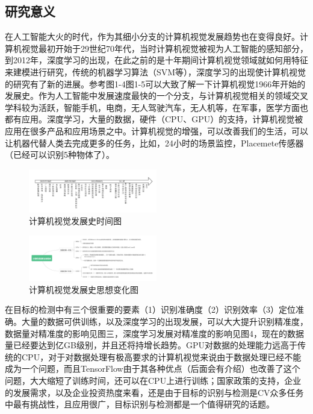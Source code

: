 		\subsection{研究意义}
		在人工智能大火的时代，作为其细小分支的计算机视觉发展趋势也在变得良好。计算机视觉最初开始于29世纪70年代，当时计算机视觉被视为人工智能的感知部分，到2012年，深度学习的出现，在此之前的是十年期间计算机视觉领域就如何用特征来建模进行研究，传统的机器学习算法（SVM等），深度学习的出现使计算机视觉的研究有了新的进展。参考图1-4图1-5可以大致了解一下计算机视觉1966年开始的发展史。作为人工智能中发展速度最快的一个分支，与计算机视觉相关的领域交叉学科较为活跃，智能手机，电商，无人驾驶汽车，无人机等，在军事，医学方面也都有应用。深度学习，大量的数据，硬件（CPU、GPU）的支持，计算机视觉被应用在很多产品和应用场景之中。计算机视觉的增强，可以改善我们的生活，可以让机器代替人类去完成更多的任务，比如，24小时的场景监控，Placemete传感器（已经可以识别5种物体了）。
		\begin{figure}[!ht]
			\centering
			\includegraphics[width=0.5\textwidth]{figures/1-4}
			\caption{计算机视觉发展史时间图}
		\end{figure}
		\begin{figure}[!ht]
			\centering
			\includegraphics[width=0.5\textwidth]{figures/1-5}
			\caption{计算机视觉发展史思想变化图}
		\end{figure}
		
		在目标的检测中有三个很重要的要素（1）识别准确度（2）识别效率（3）定位准确。大量的数据可供训练，以及深度学习的出现发展，可以大大提升识别精准度，数据量对精准度的影响见图三，深度学习发展对精准度的影响见图4，现在的数据量已经要达到亿GB级别，并且还将持增长趋势。GPU对数据的处理能力远高于传统的CPU，对于对数据处理有极高要求的计算机视觉来说由于数据处理已经不能成为一个问题，而且TensorFlow由于其各种优点（后面会有介绍）也改善了这个问题，大大缩短了训练时间，还可以在CPU上进行训练；国家政策的支持，企业的发展需求，以及企业投资热度来看，还是由于目标的识别与检测是CV众多任务中最有挑战性，且应用很广，目标识别与检测都是一个值得研究的话题。
		
